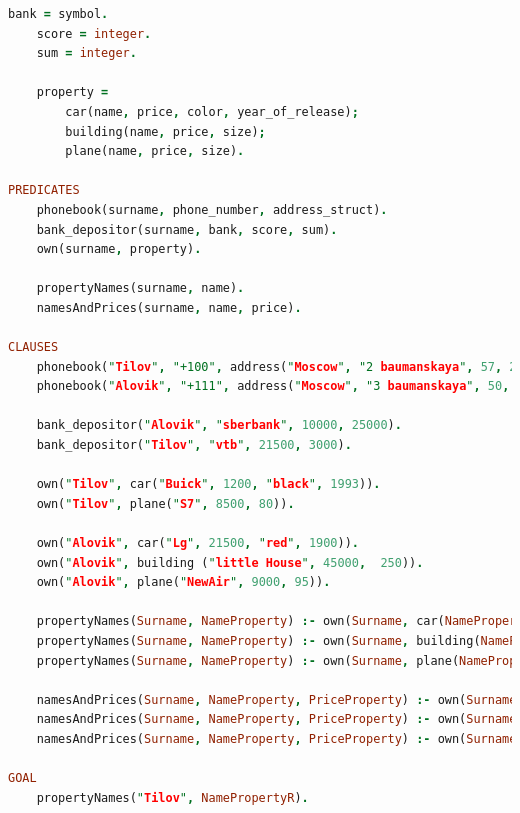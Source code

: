\documentclass[a4paper,oneside,12pt]{extreport}
\begin{document}
\begin{task}
\begin{lstlisting}[language=Prolog]
    bank = symbol.
    score = integer.
    sum = integer.
    
    property = 
        car(name, price, color, year_of_release);
        building(name, price, size);
        plane(name, price, size).

PREDICATES
    phonebook(surname, phone_number, address_struct).
    bank_depositor(surname, bank, score, sum).
    own(surname, property).
    
    propertyNames(surname, name).
    namesAndPrices(surname, name, price).

CLAUSES
    phonebook("Tilov", "+100", address("Moscow", "2 baumanskaya", 57, 25)).
    phonebook("Alovik", "+111", address("Moscow", "3 baumanskaya", 50, 75)).
    
    bank_depositor("Alovik", "sberbank", 10000, 25000).
    bank_depositor("Tilov", "vtb", 21500, 3000).

    own("Tilov", car("Buick", 1200, "black", 1993)).
    own("Tilov", plane("S7", 8500, 80)).
    
    own("Alovik", car("Lg", 21500, "red", 1900)).
    own("Alovik", building ("little House", 45000,  250)).
    own("Alovik", plane("NewAir", 9000, 95)).
    
    propertyNames(Surname, NameProperty) :- own(Surname, car(NameProperty, _, _, _)).
    propertyNames(Surname, NameProperty) :- own(Surname, building(NameProperty, _, _)).
    propertyNames(Surname, NameProperty) :- own(Surname, plane(NameProperty, _, _)).
        
    namesAndPrices(Surname, NameProperty, PriceProperty) :- own(Surname, car(NameProperty, PriceProperty, _, _)).
    namesAndPrices(Surname, NameProperty, PriceProperty) :- own(Surname, building(NameProperty, PriceProperty, _)).
    namesAndPrices(Surname, NameProperty, PriceProperty) :- own(Surname, plane(NameProperty, PriceProperty, _)).

GOAL
    propertyNames("Tilov", NamePropertyR).
    \end{lstlisting}

    \begin{figure}[ht!]
    \end{figure}


\end{task}
\end{document}
